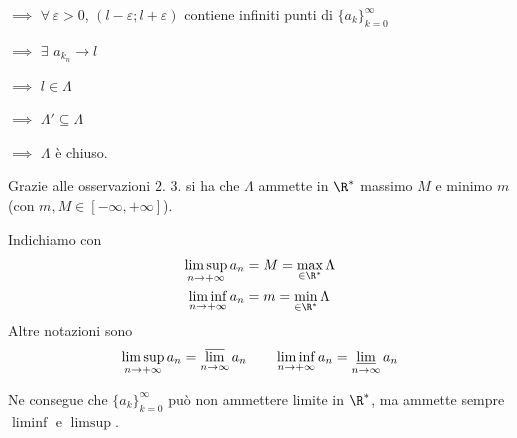 {\begin{enumerate}
        $\implies$ $ \forall\, \varepsilon>0 $, $ (l- \varepsilon; l+ \varepsilon) $ contiene infiniti punti di $ \{a_{k} \}_{k=0}^\infty $ 
        
        $\implies$ $ \exists $ $ a_{k_{n} }\longrightarrow l $ 
        
        $\implies$ $ l \in \Lambda $ 
        
        $\implies$ $ \Lambda' \subseteq\Lambda $ 
        
        $\implies$ $ \Lambda $ è chiuso.
    \end{enumerate}
}

Grazie alle osservazioni $ 2.$ $ 3. $ si ha che $ \Lambda $ ammette in $ \R^{*} $ massimo $ M $ e minimo $ m $ (con $ m,M \in [- \infty, + \infty] $).

Indichiamo con \begin{align*}
    \limsup_{n\to + \infty} a_{n} &= M =\max_{ \in \R^{*}} \Lambda\\
    \liminf_{n\to + \infty} a_{n} &= m =\min_{ \in \R^{*}} \Lambda
\end{align*}
Altre notazioni sono \[
    \limsup_{n\to + \infty} a_{n} = \varlimsup_{n\to \infty} a_{n}\qquad \liminf_{n\to + \infty} a_{n} = \varliminf_{n\to \infty} a_{n} 
\]

Ne consegue che $ \{a_{k} \}_{k=0}^\infty $ può non ammettere limite in $ \R^{*} $, ma ammette sempre $ \liminf $ e $ \limsup $.



